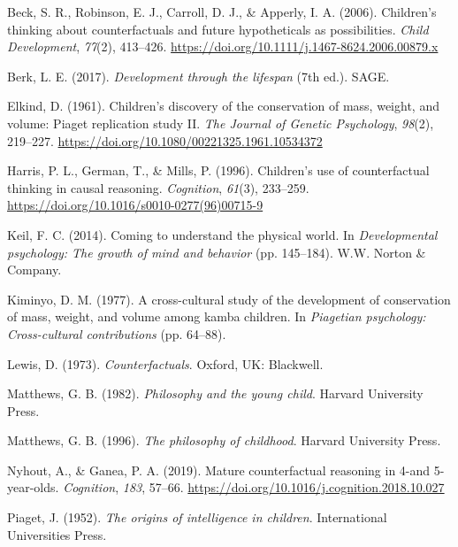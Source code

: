 \documentclass[
  doc]{apa6}
\newlength{\cslhangindent}
\newenvironment{CSLReferences}[2] %
 {\begin{list}{}{%
  \setlength{\itemindent}{0pt}
  \setlength{\leftmargin}{0pt}
  \setlength{\parsep}{0pt}
  \ifodd #1
   \setlength{\leftmargin}{\cslhangindent}
   \setlength{\itemindent}{-1\cslhangindent}
  \fi
  \setlength{\itemsep}{#2\baselineskip}}}
 {\end{list}}
\begin{document}
\label{refs}
\begin{CSLReferences}{1}{0}
Beck, S. R., Robinson, E. J., Carroll, D. J., \& Apperly, I. A. (2006). Children's thinking about counterfactuals and future hypotheticals as possibilities. \emph{Child Development}, \emph{77}(2), 413--426. \url{https://doi.org/10.1111/j.1467-8624.2006.00879.x}

Berk, L. E. (2017). \emph{Development through the lifespan} (7th ed.). SAGE.

Elkind, D. (1961). Children's discovery of the conservation of mass, weight, and volume: Piaget replication study II. \emph{The Journal of Genetic Psychology}, \emph{98}(2), 219--227. \url{https://doi.org/10.1080/00221325.1961.10534372}

Harris, P. L., German, T., \& Mills, P. (1996). Children's use of counterfactual thinking in causal reasoning. \emph{Cognition}, \emph{61}(3), 233--259. \url{https://doi.org/10.1016/s0010-0277(96)00715-9}

Keil, F. C. (2014). Coming to understand the physical world. In \emph{Developmental psychology: The growth of mind and behavior} (pp. 145--184). W.W. Norton \& Company.

Kiminyo, D. M. (1977). A cross-cultural study of the development of conservation of mass, weight, and volume among kamba children. In \emph{Piagetian psychology: Cross-cultural contributions} (pp. 64--88).

Lewis, D. (1973). \emph{Counterfactuals}. Oxford, UK: Blackwell.

Matthews, G. B. (1982). \emph{Philosophy and the young child}. Harvard University Press.

Matthews, G. B. (1996). \emph{The philosophy of childhood}. Harvard University Press.

Nyhout, A., \& Ganea, P. A. (2019). Mature counterfactual reasoning in 4-and 5-year-olds. \emph{Cognition}, \emph{183}, 57--66. \url{https://doi.org/10.1016/j.cognition.2018.10.027}

Piaget, J. (1952). \emph{The origins of intelligence in children}. International Universities Press.


\end{CSLReferences}
\end{document}
